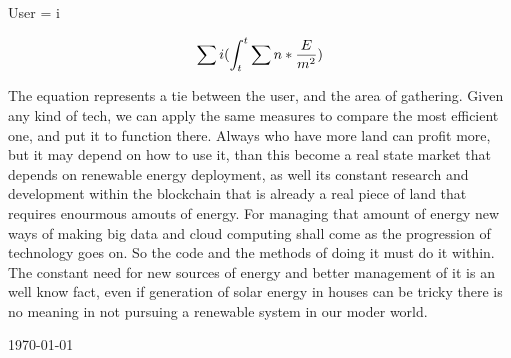 \documentclass[a4paper,12pt]{article}
\begin{document}
\begin{center}
\begin{flushleft}
  User = i
  \vspace*{0.05\baselineskip}
  \begin{center}
    \begin{equation}
  \sum{i}  (\int_t^t \sum n * \frac{E}{m^2})
  \vspace*{0.05\baselineskip}
    \end{equation}
  \end{center}
    The equation represents a tie between the user, and the area of gathering.
    Given any kind of tech, we can apply the same measures to compare the most
    efficient one, and put it to function there. Always who have more land can
    profit more, but it may depend on how to use it, than this become a real
    state market that depends on renewable energy deployment, as well its
    constant research and development within the blockchain that is already a
    real piece of land that requires enourmous amouts of energy.
    \linebreak
    \vspace*{0.05\baselineskip}
    For managing that amount of energy new ways of making big data and cloud
    computing shall come as the progression of technology goes on. So the code
    and the methods of doing it must do it within. The constant need for
    new sources of energy and better management of it is an well know fact,
    even if generation of solar energy in houses can be tricky there is no
    meaning in not pursuing a renewable system in our moder world.
\end{flushleft}
\end{center}
\begin{center}
    \today
  \end{center}
\end{document}
